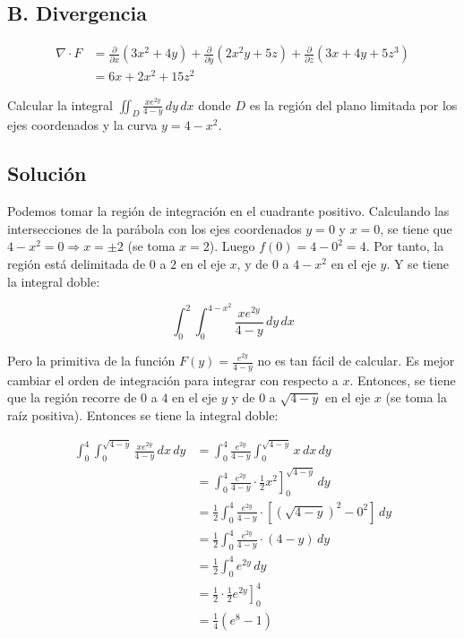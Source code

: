 \documentclass{article}
\begin{document}
\subsection*{\bf B. Divergencia}

\begin{align*}
\nabla\cdot F 
& = \frac{\partial}{\partial x}(3x^2+4y)+\frac{\partial}{\partial y}(2x^2y+5z)+\frac{\partial}{\partial z}(3x+4y+5z^3)\\
& =6x+2x^2+15z^2
\end{align*}\vs

\item Calcular la integral $\displaystyle\iint_D\frac{xe^{2y}}{4-y}\,dy\,dx$ donde $D$ es la región del plano limitada por los ejes coordenados y la curva $y=4-x^2$. \vs

\subsection*{\bf Solución}

Podemos tomar la región de integración en el cuadrante positivo. Calculando las intersecciones de la parábola con los ejes coordenados $y=0$ y $x=0$, se tiene que $4-x^2=0\Longrightarrow x=\pm 2$ (se toma $x=2$). Luego $f(0)=4-0^2=4$. Por tanto, la región está delimitada de $0$ a $2$ en el eje $x$, y de $0$ a $4-x^2$ en el eje $y$. Y se tiene la integral doble:

$$\int_0^2\int_0^{4-x^2}\frac{xe^{2y}}{4-y}\,dy\,dx$$

\vs

Pero la primitiva de la función $F(y)=\frac{e^{2y}}{4-y}$ no es tan fácil de calcular. Es mejor cambiar el orden de integración para integrar con respecto a $x$. Entonces, se tiene que la región recorre de $0$ a $4$ en el eje $y$ y de $0$ a $\sqrt{4-y}$ en el eje $x$ (se toma la raíz positiva). Entonces se tiene la integral doble:

\begin{align*} \int_0^4\int_0^{\sqrt{4-y}}\frac{xe^{2y}}{4-y}\,dx\,dy & =\int_0^4\frac{e^{2y}}{4-y}\int_0^{\sqrt{4-y}}x\,dx\,dy \\ & ={\left.\int_0^4\frac{e^{2y}}{4-y}\cdot\frac12x^2\right]}_0^{\sqrt{4-y}}\,dy \\ & =\frac12\int_0^4\frac{e^{2y}}{4-y}\cdot\left[\left(\sqrt{4-y}\right)^2-0^2\right]\,dy \\ & =\frac12\int_0^4\frac{e^{2y}}{4-y}\cdot (4-y)\,dy \\ & =\frac12\int_0^4 e^{2y}\,dy \\ & ={\left.\frac12\cdot\frac12 e^{2y}\right]}_0^4 \\ & =\frac14(e^8-1) \end{align*}
\end{document}
